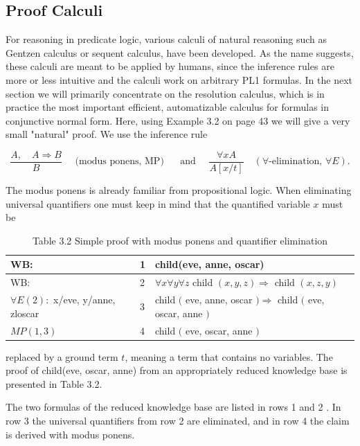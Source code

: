 \documentclass[10pt]{book}
\begin{document}
\subsection*{Proof Calculi}
For reasoning in predicate logic, various calculi of natural reasoning such as Gentzen calculus or sequent calculus, have been developed. As the name suggests, these calculi are meant to be applied by humans, since the inference rules are more or less intuitive and the calculi work on arbitrary PL1 formulas. In the next section we will primarily concentrate on the resolution calculus, which is in practice the most important efficient, automatizable calculus for formulas in conjunctive normal form. Here, using Example 3.2 on page 43 we will give a very small "natural" proof. We use the inference rule

$$
\frac{A, \quad A \Rightarrow B}{B} \quad \text { (modus ponens, MP) } \quad \text { and } \quad \frac{\forall x A}{A[x / t]} \quad(\forall \text {-elimination, } \forall E) .
$$

The modus ponens is already familiar from propositional logic. When eliminating universal quantifiers one must keep in mind that the quantified variable $x$ must be

\begin{table}[htbp]
\begin{center}
\captionsetup{labelformat=empty}
\caption{Table 3.2 Simple proof with modus ponens and quantifier elimination}
\begin{tabular}{lll}
\hline
WB: & 1 & child(eve, anne, oscar) \\
\hline
WB: & 2 & $\forall x \forall y \forall z$ child $(x, y, z) \Rightarrow$ child $(x, z, y)$ \\
\hline
$\forall E(2):$ x/eve, y/anne, zloscar & 3 & child $($ eve, anne, oscar $) \Rightarrow$ child $($ eve, oscar, anne $)$ \\
\hline
$M P(1,3)$ & 4 & child $($ eve, oscar, anne $)$ \\
\hline
\end{tabular}
\end{center}
\end{table}

replaced by a ground term $t$, meaning a term that contains no variables. The proof of child(eve, oscar, anne) from an appropriately reduced knowledge base is presented in Table 3.2.


The two formulas of the reduced knowledge base are listed in rows 1 and 2 . In row 3 the universal quantifiers from row 2 are eliminated, and in row 4 the claim is derived with modus ponens.
\end{document}
